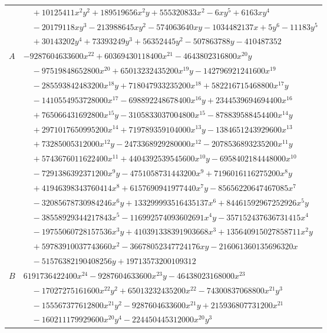 \documentclass[11pt]{article}
\begin{document}
\begin{longtable}{@{}ll@{}}
 & $\quad +10125411x^{2}y^{2}+189519656x^{2}y+555320833x^{2}-6xy^{5}+6163xy^{4}$\\
 & $\quad -20179118xy^{3}-213988645xy^{2}-574063640xy-1034482137x+5y^{6}-11183y^{5}$\\
 & $\quad +30143202y^{4}+73393249y^{3}+56352445y^{2}-507863788y-410487352$\\
$A$ & $-9287604633600x^{22}+60369430118400x^{21}-4643802316800x^{20}y$\\
 & $\quad -97519848652800x^{20}+65013232435200x^{19}y-142796921241600x^{19}$\\
 & $\quad -285593842483200x^{18}y+718047933235200x^{18}+582216715468800x^{17}y$\\
 & $\quad -1410554953728000x^{17}-698892248678400x^{16}y+2344539694694400x^{16}$\\
 & $\quad +765066431692800x^{15}y-3105833037004800x^{15}-878839588454400x^{14}y$\\
 & $\quad +2971017650995200x^{14}+719789359104000x^{13}y-1384651243929600x^{13}$\\
 & $\quad +73285005312000x^{12}y-2473368929280000x^{12}-2078536893235200x^{11}y$\\
 & $\quad +5743676011622400x^{11}+4404392539545600x^{10}y-6958402184448000x^{10}$\\
 & $\quad -7291386392371200x^{9}y-4751058731443200x^{9}+7196016116275200x^{8}y$\\
 & $\quad +41946398343760414x^{8}+6157690941977440x^{7}y-85656220647467085x^{7}$\\
 & $\quad -32085678730984246x^{6}y+133299993516435137x^{6}+84461592967252926x^{5}y$\\
 & $\quad -38558929344217843x^{5}-116992574093602691x^{4}y-357152437636731415x^{4}$\\
 & $\quad -19755060728157536x^{3}y+410391338391903668x^{3}+135640915027858711x^{2}y$\\
 & $\quad +59783910037743660x^{2}-36678052347724176xy-216061360135696320x$\\
 & $\quad -51576382190408256y+19713573200109312$\\
$B$ & $6191736422400x^{24}-9287604633600x^{23}y-46438023168000x^{23}$\\
 & $\quad -17027275161600x^{22}y^{2}+65013232435200x^{22}-74300837068800x^{21}y^{3}$\\
 & $\quad -155567377612800x^{21}y^{2}-9287604633600x^{21}y+215936807731200x^{21}$\\
 & $\quad -160211179929600x^{20}y^{4}-224450445312000x^{20}y^{3}$\\

\end{longtable}
\end{document}
